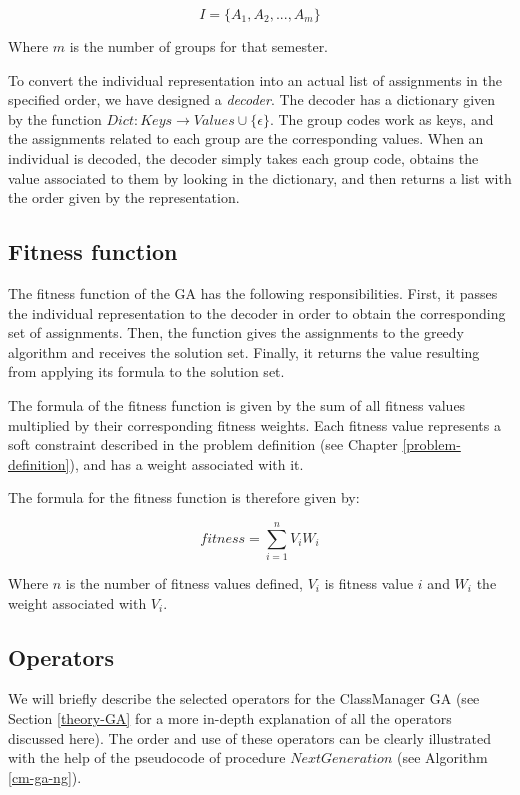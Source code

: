 \begin{equation}
    I = \{ A_{1}, A_{2}, ..., A_{m}\}
\end{equation}

Where $m$ is the number of groups for that semester.

To convert the individual representation into an actual list of assignments in the specified order, we have designed a \textit{decoder}. The decoder has a dictionary given by the function $Dict: Keys \rightarrow Values \cup \{ \epsilon \}$. The group codes work as keys, and the assignments related to each group are the corresponding values. When an individual is decoded, the decoder simply takes each group code, obtains the value associated to them by looking in the dictionary, and then returns a list with the order given by the representation.


\subsection{Fitness function}

The fitness function of the GA has the following responsibilities. First, it passes the individual representation to the decoder in order to obtain the corresponding set of assignments. Then, the function gives the assignments to the greedy algorithm and receives the solution set. Finally, it returns the value resulting from applying its formula to the solution set. 

The formula of the fitness function is given by the sum of all fitness values multiplied by their corresponding fitness weights. Each fitness value represents a soft constraint described in the problem definition (see Chapter \ref{problem-definition}), and has a weight associated with it. 

The formula for the fitness function is therefore given by:

\begin{equation}
    fitness = \sum_{i=1}^{n} V_{i} W_{i}
\end{equation}

Where $n$ is the number of fitness values defined, $V_{i}$ is fitness value $i$ and $W_{i}$ the weight associated with $V_{i}$.


\subsection{Operators}

We will briefly describe the selected operators for the ClassManager GA (see Section \ref{theory-GA} for a more in-depth explanation of all the operators discussed here). The order and use of these operators can be clearly illustrated with the help of the pseudocode of procedure $NextGeneration$ (see Algorithm \ref{cm-ga-ng}).


